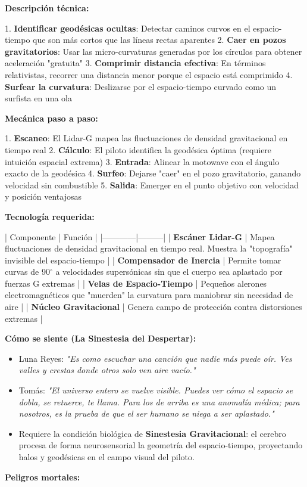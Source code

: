 \documentclass[11pt,a4paper]{report}
\begin{document}
\textbf{Descripción técnica:}

1. \textbf{Identificar geodésicas ocultas}: Detectar caminos curvos en el espacio-tiempo que son más cortos que las líneas rectas aparentes
2. \textbf{Caer en pozos gravitatorios}: Usar las micro-curvaturas generadas por los círculos para obtener aceleración "gratuita"
3. \textbf{Comprimir distancia efectiva}: En términos relativistas, recorrer una distancia menor porque el espacio está comprimido
4. \textbf{Surfear la curvatura}: Deslizarse por el espacio-tiempo curvado como un surfista en una ola

\textbf{Mecánica paso a paso:}

1. \textbf{Escaneo}: El Lidar-G mapea las fluctuaciones de densidad gravitacional en tiempo real
2. \textbf{Cálculo}: El piloto identifica la geodésica óptima (requiere intuición espacial extrema)
3. \textbf{Entrada}: Alinear la motowave con el ángulo exacto de la geodésica
4. \textbf{Surfeo}: Dejarse "caer" en el pozo gravitatorio, ganando velocidad sin combustible
5. \textbf{Salida}: Emerger en el punto objetivo con velocidad y posición ventajosas

\textbf{Tecnología requerida:}

| Componente | Función |
|------------|---------|
| \textbf{Escáner Lidar-G} | Mapea fluctuaciones de densidad gravitacional en tiempo real. Muestra la "topografía" invisible del espacio-tiempo |
| \textbf{Compensador de Inercia} | Permite tomar curvas de 90$^\circ$ a velocidades supersónicas sin que el cuerpo sea aplastado por fuerzas G extremas |
| \textbf{Velas de Espacio-Tiempo} | Pequeños alerones electromagnéticos que "muerden" la curvatura para maniobrar sin necesidad de aire |
| \textbf{Núcleo Gravitacional} | Genera campo de protección contra distorsiones extremas |

\textbf{Cómo se siente (La Sinestesia del Despertar):}

\begin{itemize}
  \item Luna Reyes: \textit{"Es como escuchar una canción que nadie más puede oír. Ves valles y crestas donde otros solo ven aire vacío."}
  \item Tomás: \textit{"El universo entero se vuelve visible. Puedes ver cómo el espacio se dobla, se retuerce, te llama. Para los de arriba es una anomalía médica; para nosotros, es la prueba de que el ser humano se niega a ser aplastado."}
  \item Requiere la condición biológica de \textbf{Sinestesia Gravitacional}: el cerebro procesa de forma neurosensorial la geometría del espacio-tiempo, proyectando halos y geodésicas en el campo visual del piloto.

\end{itemize}
\textbf{Peligros mortales:}
\end{document}

